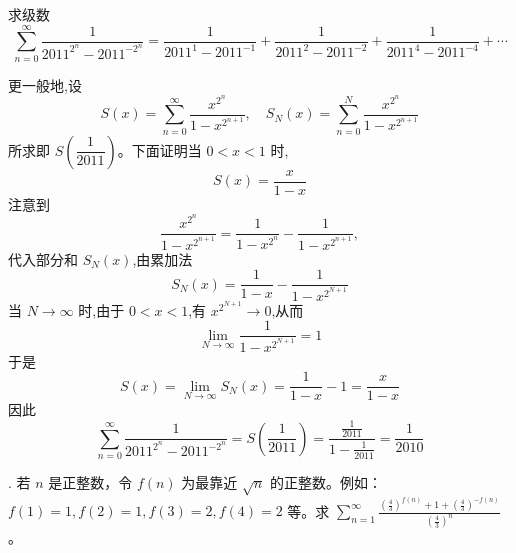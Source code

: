\begin{questions}
    \question 求级数
    \[
    \sum_{n=0}^{\infty} \frac{1}{2011^{2^{n}} - 2011^{-2^{n}}}
    = \frac{1}{2011^{1} - 2011^{-1}} + \frac{1}{2011^{2} - 2011^{-2}} + \frac{1}{2011^{4} - 2011^{-4}} + \cdots
    \]
    \begin{solution}
        更一般地,设
        \[
        S(x) = \sum_{n=0}^{\infty} \frac{x^{2^{n}}}{1 - x^{2^{n+1}}}, \quad
        S_N(x) = \sum_{n=0}^{N} \frac{x^{2^{n}}}{1 - x^{2^{n+1}}}
        \]
        所求即 $S\left(\dfrac{1}{2011}\right)$。下面证明当 $0<x<1$ 时,
        \[
        S(x) = \frac{x}{1-x}
        \]
        注意到
        \[
        \frac{x^{2^{n}}}{1 - x^{2^{n+1}}}
        = \frac{1}{1 - x^{2^{n}}} - \frac{1}{1 - x^{2^{n+1}}},
        \]
        代入部分和 $S_N(x)$,由累加法
        \[
        S_N(x) = \frac{1}{1-x} - \frac{1}{1-x^{2^{N+1}}}
        \]
        当 $N \to \infty$ 时,由于 $0<x<1$,有 $x^{2^{N+1}} \to 0$,从而
        \[
        \lim_{N\to\infty} \frac{1}{1-x^{2^{N+1}}} = 1
        \]
        于是
        \[
        S(x) = \lim_{N\to\infty} S_N(x) = \frac{1}{1-x} - 1 = \frac{x}{1-x}
        \]
        因此
        \[
        \sum_{n=0}^{\infty} \frac{1}{2011^{2^{n}} - 2011^{-2^{n}}}
        = S\!\left(\frac{1}{2011}\right)
        = \frac{\frac{1}{2011}}{1-\frac{1}{2011}}
        = \frac{1}{2010}
        \]
    \end{solution}
. 若 $n$ 是正整数，令 $f(n)$ 为最靠近 $\sqrt{n}$ 的正整数。例如：$f(1)=1, f(2)=1, f(3)=2, f(4)=2$ 等。求 $\sum_{n=1}^{\infty} \frac{\left( \frac{4}{3} \right)^{f(n)} + 1 + \left( \frac{4}{3} \right)^{-f(n)}}{\left( \frac{4}{3} \right)^{n}}$。


\end{questions}
